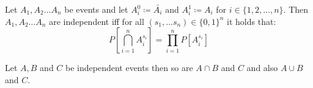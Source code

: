 \begin{lemma}

    Let $A_1, A_2 \dots A_n$ be events and let $A_i^{0} \coloneqq \bar{A_i}$ and $A_i^{1} \coloneqq A_i$ for
    $i \in \{1, 2, \dots, n\}$.
    Then $A_1, A_2 \dots A_n$ are independent iff for all $(s_1, \dots s_n) \in \{0,1\}^{n}$ it holds that:
    $$P[\bigcap_{i=1}^n A_i^{s_i}] = \prod_{i=1}^n P[A_i^{s_i}]$$
    
\end{lemma}

\begin{lemma}

    Let $A, B$ and $C$ be independent events then so are $A \cap B$ and $C$ and also $A \cup B$ and $C$.
    
\end{lemma}

